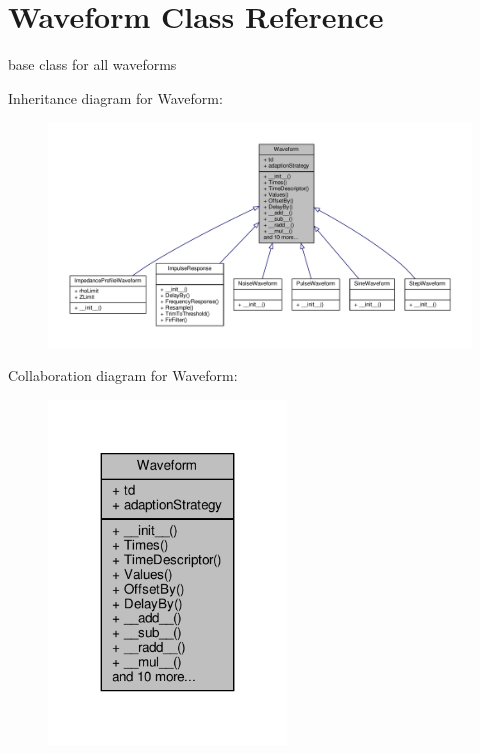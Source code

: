 \hypertarget{classSignalIntegrity_1_1TimeDomain_1_1Waveform_1_1Waveform_1_1Waveform}{}\section{Waveform Class Reference}
\label{classSignalIntegrity_1_1TimeDomain_1_1Waveform_1_1Waveform_1_1Waveform}


base class for all waveforms  




Inheritance diagram for Waveform\+:
\nopagebreak
\begin{figure}[H]
\begin{center}
\leavevmode
\includegraphics[width=350pt]{classSignalIntegrity_1_1TimeDomain_1_1Waveform_1_1Waveform_1_1Waveform__inherit__graph}
\end{center}
\end{figure}


Collaboration diagram for Waveform\+:
\nopagebreak
\begin{figure}[H]
\begin{center}
\leavevmode
\includegraphics[width=179pt]{classSignalIntegrity_1_1TimeDomain_1_1Waveform_1_1Waveform_1_1Waveform__coll__graph}
\end{center}
\end{figure}
